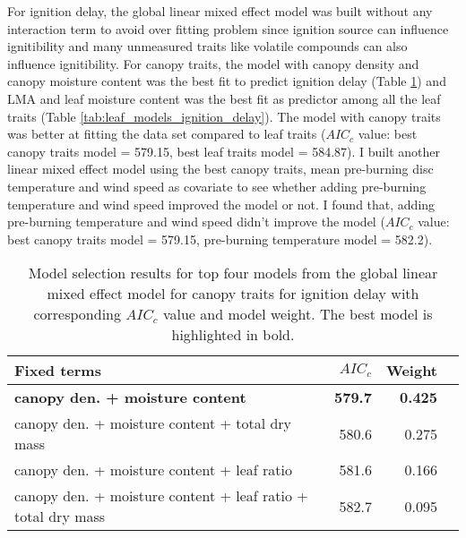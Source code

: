 \documentclass{ttuthes2007}
\begin{document}
For ignition delay, the global linear mixed effect model was built without any interaction term  to avoid over fitting problem since ignition source can influence ignitibility \citep{madrigal2012evaluation} and many unmeasured traits like volatile compounds can also influence ignitibility. For canopy traits, the model with canopy density and canopy moisture content was the best fit to predict ignition delay (Table \ref{tab:canopy_models_ignition_delay}) and LMA and leaf moisture content was the best fit as predictor among all the leaf traits (Table \ref{tab:leaf_models_ignition_delay}). The model with canopy traits was better at fitting the data set compared to leaf traits ($AIC_{c}$ value: best canopy traits model = 579.15, best leaf traits model = 584.87). I built another linear mixed effect model using the best canopy traits,  mean pre-burning disc temperature and wind speed as  covariate to see whether adding pre-burning temperature and wind speed improved the model or not. I found that, adding pre-burning temperature and wind speed didn't improve the model ($AIC_{c}$ value: best canopy traits model = 579.15, pre-burning temperature model = 582.2).



\begin{table}
  \centering
  \caption{Model selection results for top four models from the global linear
    mixed effect model for canopy traits for ignition delay with corresponding
    $AIC_{c}$ value and model weight. The best model is highlighted in bold.}
  \begin{tabular}{lrrr}
    \toprule
    \textbf{Fixed terms} & $AIC_{c}$ & \textbf{Weight}\\
    \midrule
    \textbf{canopy den. + moisture content}    & \textbf{579.7} & \textbf{0.425} \\
    canopy den. + moisture content + total dry mass   & 580.6   & 0.275 \\
    canopy den. + moisture content + leaf ratio       & 581.6   & 0.166  \\
    canopy den. + moisture content + leaf ratio + total dry mass & 582.7  & 0.095 \\
    \bottomrule
  \end{tabular}
  \label{tab:canopy_models_ignition_delay}
\end{table}
\end{document}
